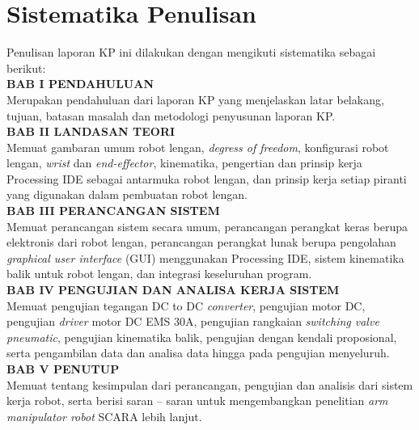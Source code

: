 \section{Sistematika Penulisan}
Penulisan laporan KP ini dilakukan dengan mengikuti sistematika sebagai berikut:\\
\noindent
\textbf{BAB I\hspace*{0.6cm} PENDAHULUAN}\\
\noindent
Merupakan pendahuluan dari laporan KP yang menjelaskan latar belakang, tujuan, batasan masalah dan metodologi penyusunan laporan KP.\\
\noindent
\textbf{BAB II\hspace*{0.5cm} LANDASAN TEORI}\\
\noindent
Memuat gambaran umum robot lengan, \emph {degress of freedom}, konfigurasi robot lengan, \emph{wrist} dan \textit{end-effector}, kinematika, pengertian dan prinsip kerja Processing IDE sebagai antarmuka robot lengan, dan prinsip kerja setiap piranti yang digunakan dalam pembuatan robot lengan. \\
\textbf{BAB III\hspace*{0.375cm}  PERANCANGAN SISTEM}\\
\noindent
Memuat perancangan sistem secara umum, perancangan perangkat keras berupa elektronis dari robot lengan, perancangan perangkat lunak berupa pengolahan \textit{graphical user interface} (GUI) menggunakan Processing IDE, sistem kinematika balik untuk robot lengan, dan integrasi keseluruhan program. \\
\textbf{BAB IV\hspace*{0.4cm}  PENGUJIAN DAN ANALISA KERJA SISTEM }\\
\noindent
Memuat pengujian tegangan DC to DC \textit{converter}, pengujian motor DC, pengujian \textit{driver} motor DC EMS 30A, pengujian rangkaian \textit{switching valve pneumatic}, pengujian kinematika balik, pengujian dengan kendali proposional, serta pengambilan data dan analisa data hingga pada pengujian menyeluruh.\\
\textbf{BAB V\hspace*{0.6cm} PENUTUP}\\
Memuat tentang kesimpulan dari perancangan, pengujian dan analisis dari sistem kerja robot, serta berisi saran – saran untuk mengembangkan penelitian \emph{ arm manipulator robot} SCARA lebih lanjut. \\